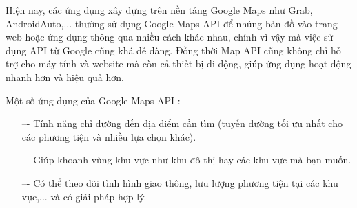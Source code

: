 Hiện nay, các ứng dụng xây dựng trên nền tảng Google Maps như Grab, AndroidAuto,... thường sử dụng Google Maps API để nhúng bản đồ vào trang web hoặc ứng dụng thông qua nhiều cách khác nhau, chính vì vậy mà việc sử dụng API từ Google cũng khá dễ dàng. Đồng thời Map API cũng không chỉ hỗ trợ cho máy tính và website mà còn cả thiết bị di động, giúp ứng dụng hoạt động nhanh hơn và hiệu quả hơn.

Một số ứng dụng của Google Maps API :
\begin{itemize}
    \item[–-] Tính năng chỉ đường đến địa điểm cần tìm (tuyến đường tối ưu nhất cho các phương tiện và nhiều lựa chọn khác).
    \item[–-] Giúp khoanh vùng khu vực như khu đô thị hay các khu vực mà bạn muốn.
    \item[–-] Có thể theo dõi tình hình giao thông, lưu lượng phương tiện tại các khu vực,... và có giải pháp hợp lý.
\end{itemize}
